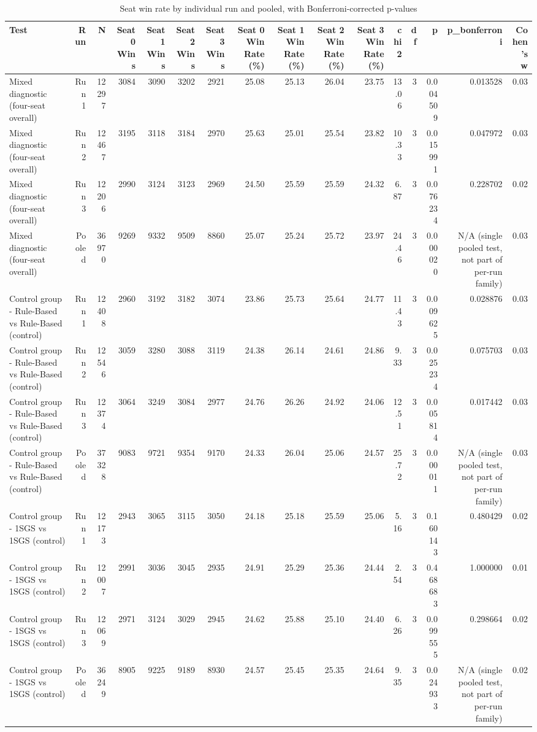 \begin{table}[htbp]
\centering
\caption{Seat win rate by individual run and pooled, with Bonferroni-corrected p-values}
\label{tab:seat_confirm_by_run}
\begin{tabular}{lrrrrrrrrrrrrrrr}
\toprule
Test & Run & N & Seat 0 Wins & Seat 1 Wins & Seat 2 Wins & Seat 3 Wins & Seat 0 Win Rate (\%) & Seat 1 Win Rate (\%) & Seat 2 Win Rate (\%) & Seat 3 Win Rate (\%) & chi2 & df & p & p\_bonferroni & Cohen's w \\
\midrule
Mixed diagnostic (four-seat overall) & Run 1 & 12297 & 3084 & 3090 & 3202 & 2921 & 25.08 & 25.13 & 26.04 & 23.75 & 13.06 & 3 & 0.004509 & 0.013528 & 0.03 \\
Mixed diagnostic (four-seat overall) & Run 2 & 12467 & 3195 & 3118 & 3184 & 2970 & 25.63 & 25.01 & 25.54 & 23.82 & 10.33 & 3 & 0.015991 & 0.047972 & 0.03 \\
Mixed diagnostic (four-seat overall) & Run 3 & 12206 & 2990 & 3124 & 3123 & 2969 & 24.50 & 25.59 & 25.59 & 24.32 & 6.87 & 3 & 0.076234 & 0.228702 & 0.02 \\
Mixed diagnostic (four-seat overall) & Pooled & 36970 & 9269 & 9332 & 9509 & 8860 & 25.07 & 25.24 & 25.72 & 23.97 & 24.46 & 3 & 0.000020 & N/A (single pooled test, not part of per-run family) & 0.03 \\
Control group - Rule-Based vs Rule-Based (control) & Run 1 & 12408 & 2960 & 3192 & 3182 & 3074 & 23.86 & 25.73 & 25.64 & 24.77 & 11.43 & 3 & 0.009625 & 0.028876 & 0.03 \\
Control group - Rule-Based vs Rule-Based (control) & Run 2 & 12546 & 3059 & 3280 & 3088 & 3119 & 24.38 & 26.14 & 24.61 & 24.86 & 9.33 & 3 & 0.025234 & 0.075703 & 0.03 \\
Control group - Rule-Based vs Rule-Based (control) & Run 3 & 12374 & 3064 & 3249 & 3084 & 2977 & 24.76 & 26.26 & 24.92 & 24.06 & 12.51 & 3 & 0.005814 & 0.017442 & 0.03 \\
Control group - Rule-Based vs Rule-Based (control) & Pooled & 37328 & 9083 & 9721 & 9354 & 9170 & 24.33 & 26.04 & 25.06 & 24.57 & 25.72 & 3 & 0.000011 & N/A (single pooled test, not part of per-run family) & 0.03 \\
Control group - 1SGS vs 1SGS (control) & Run 1 & 12173 & 2943 & 3065 & 3115 & 3050 & 24.18 & 25.18 & 25.59 & 25.06 & 5.16 & 3 & 0.160143 & 0.480429 & 0.02 \\
Control group - 1SGS vs 1SGS (control) & Run 2 & 12007 & 2991 & 3036 & 3045 & 2935 & 24.91 & 25.29 & 25.36 & 24.44 & 2.54 & 3 & 0.468683 & 1.000000 & 0.01 \\
Control group - 1SGS vs 1SGS (control) & Run 3 & 12069 & 2971 & 3124 & 3029 & 2945 & 24.62 & 25.88 & 25.10 & 24.40 & 6.26 & 3 & 0.099555 & 0.298664 & 0.02 \\
Control group - 1SGS vs 1SGS (control) & Pooled & 36249 & 8905 & 9225 & 9189 & 8930 & 24.57 & 25.45 & 25.35 & 24.64 & 9.35 & 3 & 0.024933 & N/A (single pooled test, not part of per-run family) & 0.02 \\
\bottomrule
\end{tabular}
\end{table}